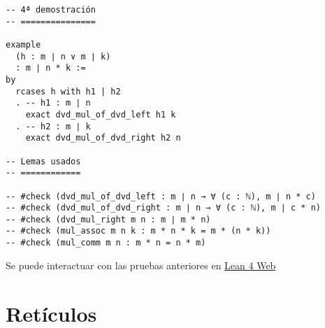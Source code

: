 \begin{verbatim}
-- 4ª demostración
-- ===============

example
  (h : m ∣ n ∨ m ∣ k)
  : m ∣ n * k :=
by
  rcases h with h1 | h2
  . -- h1 : m ∣ n
    exact dvd_mul_of_dvd_left h1 k
  . -- h2 : m ∣ k
    exact dvd_mul_of_dvd_right h2 n

-- Lemas usados
-- ============

-- #check (dvd_mul_of_dvd_left : m ∣ n → ∀ (c : ℕ), m ∣ n * c)
-- #check (dvd_mul_of_dvd_right : m ∣ n → ∀ (c : ℕ), m ∣ c * n)
-- #check (dvd_mul_right m n : m ∣ m * n)
-- #check (mul_assoc m n k : m * n * k = m * (n * k))
-- #check (mul_comm m n : m * n = n * m)
\end{verbatim}
Se puede interactuar con las pruebas anteriores en \href{https://lean.math.hhu.de/\#url=https://raw.githubusercontent.com/jaalonso/Calculemus2/main/src/CS\_de\_divisibilidad\_del\_producto.lean.lean}{Lean 4 Web}

\chapter{Retículos}
\label{sec:org7bcd818}

